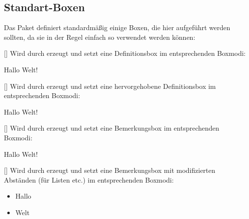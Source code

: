 \subsection{Standart-Boxen}
Das Paket  definiert standardmäßig einige Boxen, die hier aufgeführt werden sollten, da sie in der Regel einfach so verwendet werden können:

%
%
%

[]
Wird durch  erzeugt und setzt eine Definitionsbox im entsprechenden Boxmodi:
\begin{latex}
\begin{definition}[Hallo]
   Hallo Welt!
\end{definition}
\end{latex}

%
%
%

[]
Wird durch  erzeugt und setzt eine hervorgehobene Definitionsbox im entsprechenden Boxmodi:
\begin{latex}
\begin{definition*}[Hallo]
   Hallo Welt!
\end{definition*}
\end{latex}

%
%
%

[]
Wird durch  erzeugt und setzt eine Bemerkungsbox im entsprechenden Boxmodi:
\begin{latex}
\begin{bemerkung}[Hallo]
   Hallo Welt!
\end{bemerkung}
\end{latex}

%
%
%

[]
Wird durch  erzeugt und setzt eine Bemerkungsbox mit modifizierten Abständen (für Listen etc.) im entsprechenden Boxmodi:
\begin{latex}
\begin{bemerkung*}[Hallo]
   \begin{itemize}
       \item Hallo
       \item Welt
   \end{itemize}
\end{bemerkung*}
\end{latex}

